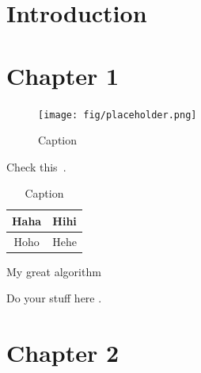 \documentclass[11pt,a4paper]{article}
\begin{document}
\listoffigures
\thispagestyle{empty}
\newpage

\listoftables
\thispagestyle{empty}
\newpage
\setcounter{page}{1}
\section{Introduction}
\blindtext

\section{Chapter 1}
\blindtext

\begin{figure}[!htbp]
    \centering
    \texttt{[image: fig/placeholder.png]}
    \caption{Caption}
    \label{fig:my_label}
\end{figure}
Check this~\cite{xu2019hardening}.\par

\begin{table}[!htbp]
    \centering
    \begin{tabular}{|c|c|}
    \hline
        Haha & Hihi \\\hline
        Hoho & Hehe \\
    \hline
    \end{tabular}
    \caption{Caption}
    \label{tab:my_label}
\end{table}

\begin{algorithm}[!tb]
\small
  \caption{My great algorithm}
  \label{algo:my_algo}
  \begin{algorithmic}[1]
        \State Do your stuff here
        \State {}.
    \EndFunction
  \end{algorithmic}
\end{algorithm}

\blindtext

\section{Chapter 2}
\blindtext
\printbibliography[heading=bibintoc,title={References}]
\end{document}

